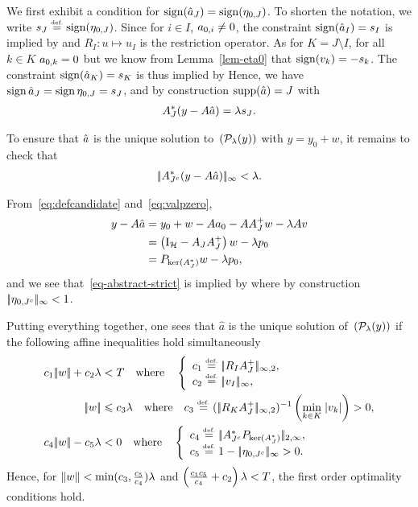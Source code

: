 We first exhibit a condition for $\operatorname{sign}(\hat{a}_J)=\operatorname{sign}(\eta_{0,J})$. To shorten the notation, we write $s_J\stackrel{\mbox{\upshape\tiny def.}}{=}\operatorname{sign}(\eta_{0,J})$.
Since for $i\in I$, $a_{0,i}\neq 0$, the constraint $\operatorname{sign}(\hat{a}_I)=s_I$ is implied by 
and  $R_I: u\mapsto u_I$  is the restriction operator.
As for $ K=J\setminus I$, for all $k\in K$ $a_{0,k}=0$ but we know from Lemma~\ref{lem-eta0} that $\operatorname{sign}(v_{k}) = -s_k$.
	The constraint $\operatorname{sign}(\hat{a}_K)=s_K$ is thus implied by 
  Hence, we have $\operatorname{sign}\hat{a}_J= \operatorname{sign} \eta_{0,J}=s_J$, and by construction $\operatorname{supp}(\hat{a}) = J$ with
	\begin{align}
		A_J^*( y-A \hat a ) = \lambda s_J.
	\end{align}

  To ensure that $\hat{a}$ is the unique solution to~$(\mathcal{P}_\lambda(y))$ with $y=y_0+w$, it remains to check that
  \begin{align}
    |\!| A_{J^c}^*(y-A \hat{a}) |\!|_{\infty}<\lambda.
    \label{eq-abstract-strict}
  \end{align}

  From~\eqref{eq:defcandidate} and~\eqref{eq:valpzero},
  \begin{align*}
    y - A \hat{a} &= y_0+w-A a_0-AA_J^+w-\lambda Av\\
                        &=\left(\mathrm{I}_{\mathcal{H}}-A_JA_J^+ \right)w- \lambda p_0\\
                        &=P_{\ker(A_J^*)} w -\lambda p_0,
  \end{align*}
and  we see that~\eqref{eq-abstract-strict} is implied by
	where by construction $|\!| \eta_{0,J^c} |\!|_{\infty}<1$.
	
	Putting everything together, one sees that $\hat a$ is the unique solution of~$(\mathcal{P}_\lambda(y))$ if the following affine inequalities hold simultaneously 
    \begin{align}
    	c_1 \norm{w} + c_2 \la &< T \qwhereq
		    \choice{
			    c_1 \eqdef \norm{R_I \Op_J^+}_{\infty,2}, \\
			    c_2 \eqdef \norm{v_I}_{\infty}, 	
		    }\\
        \norm{w} &\leq c_3\la  
      \qwhereq c_3\eqdef (\norm{R_K \Op_J^+}_{\infty,2})^{-1}\left(\umin{k \in K} |v_{k}|\right)>0,\\
      c_4 \norm{w} - c_5 \la &< 0
	    	\qwhereq
		    \choice{
			      c_4 \eqdef  \norm{ \Op_{J^c}^* P_{\ker(\Op_J^*)} }_{2,\infty}, \\
			      c_5 \eqdef  1 - \normi{\eta_{0,J^c}} >0.
        }
    \end{align}
Hence, for $\|w\| <\min(c_3,\frac{c_5}{c_4}) \lambda$ and $\left(\frac{c_1c_5}{c_4}+c_2 \right)\lambda<T$, the first order optimality conditions hold.

